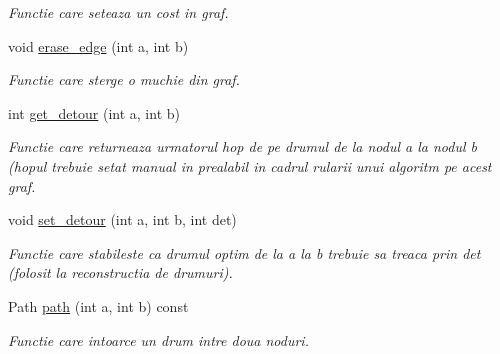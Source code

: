 \begin{DoxyCompactItemize}
\begin{DoxyCompactList}\small\item\em Functie care seteaza un cost in graf. \item\end{DoxyCompactList}\item 
\hypertarget{classGraphAdjMat_ab3a00134d8c219cba150c624850b3b41}{
void \hyperlink{classGraphAdjMat_ab3a00134d8c219cba150c624850b3b41}{erase\_\-edge} (int a, int b)}
\label{classGraphAdjMat_ab3a00134d8c219cba150c624850b3b41}

\begin{DoxyCompactList}\small\item\em Functie care sterge o muchie din graf. \item\end{DoxyCompactList}\item 
\hypertarget{classGraphAdjMat_a81e6304b47eee06cd873a9c6c81e8883}{
int \hyperlink{classGraphAdjMat_a81e6304b47eee06cd873a9c6c81e8883}{get\_\-detour} (int a, int b)}
\label{classGraphAdjMat_a81e6304b47eee06cd873a9c6c81e8883}

\begin{DoxyCompactList}\small\item\em Functie care returneaza urmatorul hop de pe drumul de la nodul a la nodul b (hopul trebuie setat manual in prealabil in cadrul rularii unui algoritm pe acest graf. \item\end{DoxyCompactList}\item 
\hypertarget{classGraphAdjMat_ac4b58b9abab3a1206bc2b6410fa7c42b}{
void \hyperlink{classGraphAdjMat_ac4b58b9abab3a1206bc2b6410fa7c42b}{set\_\-detour} (int a, int b, int det)}
\label{classGraphAdjMat_ac4b58b9abab3a1206bc2b6410fa7c42b}

\begin{DoxyCompactList}\small\item\em Functie care stabileste ca drumul optim de la a la b trebuie sa treaca prin det (folosit la reconstructia de drumuri). \item\end{DoxyCompactList}\item 
Path \hyperlink{classGraphAdjMat_ae1becbc6072af4aafc0c929e50cb18c1}{path} (int a, int b) const 
\begin{DoxyCompactList}\small\item\em Functie care intoarce un drum intre doua noduri. \item\end{DoxyCompactList}\end{DoxyCompactItemize}
